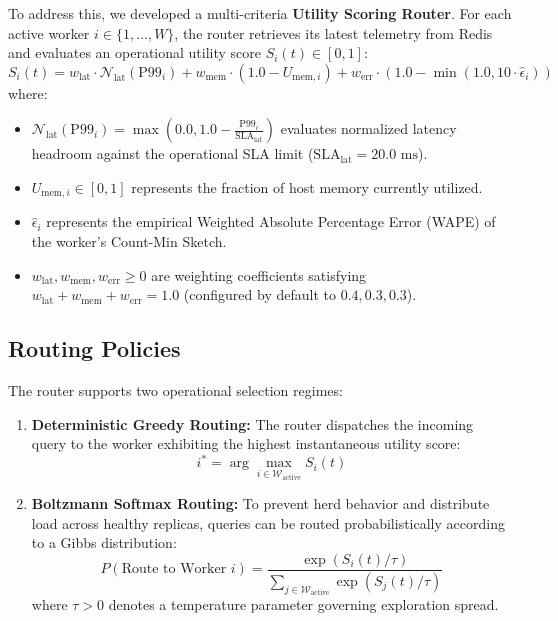 To address this, we developed a multi-criteria \textbf{Utility Scoring Router}. For each active worker $i \in \{1, \dots, W\}$, the router retrieves its latest telemetry from Redis and evaluates an operational utility score $S_i(t) \in [0, 1]$:
\begin{equation}
    S_i(t) = w_{\text{lat}} \cdot \mathcal{N}_{\text{lat}}(\text{P99}_i) + w_{\text{mem}} \cdot (1.0 - U_{\text{mem}, i}) + w_{\text{err}} \cdot (1.0 - \min(1.0, 10 \cdot \hat{\epsilon}_i))
    \label{eq:node_score}
\end{equation}
where:
\begin{itemize}
 \item $\mathcal{N}_{\text{lat}}(\text{P99}_i) = \max\left(0.0, 1.0 - \frac{\text{P99}_i}{\text{SLA}_{\text{lat}}}\right)$ evaluates normalized latency headroom against the operational SLA limit ($\text{SLA}_{\text{lat}} = 20.0\text{ ms}$).
 \item $U_{\text{mem}, i} \in [0, 1]$ represents the fraction of host memory currently utilized.
 \item $\hat{\epsilon}_i$ represents the empirical Weighted Absolute Percentage Error (WAPE) of the worker's Count-Min Sketch.
 \item $w_{\text{lat}}, w_{\text{mem}}, w_{\text{err}} \ge 0$ are weighting coefficients satisfying $w_{\text{lat}} + w_{\text{mem}} + w_{\text{err}} = 1.0$ (configured by default to $0.4, 0.3, 0.3$).
\end{itemize}

\subsection{Routing Policies}
The router supports two operational selection regimes:
\begin{enumerate}
 \item \textbf{Deterministic Greedy Routing:} The router dispatches the incoming query to the worker exhibiting the highest instantaneous utility score:
 \begin{equation}
        i^* = \arg\max_{i \in \mathcal{W}_{\text{active}}} S_i(t)
    \end{equation}
 \item \textbf{Boltzmann Softmax Routing:} To prevent herd behavior and distribute load across healthy replicas, queries can be routed probabilistically according to a Gibbs distribution:
 \begin{equation}
        P(\text{Route to Worker } i) = \frac{\exp(S_i(t) / \tau)}{\sum_{j \in \mathcal{W}_{\text{active}}} \exp(S_j(t) / \tau)}
    \end{equation}
 where $\tau > 0$ denotes a temperature parameter governing exploration spread.
\end{enumerate}


